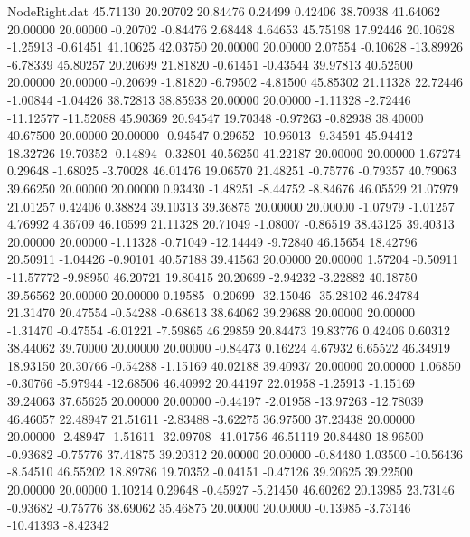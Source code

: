 \begin{filecontents}{NodeRight.dat}
  45.71130   20.20702   20.84476     0.24499    0.42406   38.70938   41.64062   20.00000   20.00000   -0.20702   -0.84476    2.68448    4.64653
  45.75198   17.92446   20.10628    -1.25913   -0.61451   41.10625   42.03750   20.00000   20.00000    2.07554   -0.10628  -13.89926   -6.78339
  45.80257   20.20699   21.81820    -0.61451   -0.43544   39.97813   40.52500   20.00000   20.00000   -0.20699   -1.81820   -6.79502   -4.81500
  45.85302   21.11328   22.72446    -1.00844   -1.04426   38.72813   38.85938   20.00000   20.00000   -1.11328   -2.72446  -11.12577  -11.52088
  45.90369   20.94547   19.70348    -0.97263   -0.82938   38.40000   40.67500   20.00000   20.00000   -0.94547    0.29652  -10.96013   -9.34591
  45.94412   18.32726   19.70352    -0.14894   -0.32801   40.56250   41.22187   20.00000   20.00000    1.67274    0.29648   -1.68025   -3.70028
  46.01476   19.06570   21.48251    -0.75776   -0.79357   40.79063   39.66250   20.00000   20.00000    0.93430   -1.48251   -8.44752   -8.84676
  46.05529   21.07979   21.01257     0.42406    0.38824   39.10313   39.36875   20.00000   20.00000   -1.07979   -1.01257    4.76992    4.36709
  46.10599   21.11328   20.71049    -1.08007   -0.86519   38.43125   39.40313   20.00000   20.00000   -1.11328   -0.71049  -12.14449   -9.72840
  46.15654   18.42796   20.50911    -1.04426   -0.90101   40.57188   39.41563   20.00000   20.00000    1.57204   -0.50911  -11.57772   -9.98950
  46.20721   19.80415   20.20699    -2.94232   -3.22882   40.18750   39.56562   20.00000   20.00000    0.19585   -0.20699  -32.15046  -35.28102
  46.24784   21.31470   20.47554    -0.54288   -0.68613   38.64062   39.29688   20.00000   20.00000   -1.31470   -0.47554   -6.01221   -7.59865
  46.29859   20.84473   19.83776     0.42406    0.60312   38.44062   39.70000   20.00000   20.00000   -0.84473    0.16224    4.67932    6.65522
  46.34919   18.93150   20.30766    -0.54288   -1.15169   40.02188   39.40937   20.00000   20.00000    1.06850   -0.30766   -5.97944  -12.68506
  46.40992   20.44197   22.01958    -1.25913   -1.15169   39.24063   37.65625   20.00000   20.00000   -0.44197   -2.01958  -13.97263  -12.78039
  46.46057   22.48947   21.51611    -2.83488   -3.62275   36.97500   37.23438   20.00000   20.00000   -2.48947   -1.51611  -32.09708  -41.01756
  46.51119   20.84480   18.96500    -0.93682   -0.75776   37.41875   39.20312   20.00000   20.00000   -0.84480    1.03500  -10.56436   -8.54510
  46.55202   18.89786   19.70352    -0.04151   -0.47126   39.20625   39.22500   20.00000   20.00000    1.10214    0.29648   -0.45927   -5.21450
  46.60262   20.13985   23.73146    -0.93682   -0.75776   38.69062   35.46875   20.00000   20.00000   -0.13985   -3.73146  -10.41393   -8.42342

\end{filecontents}
